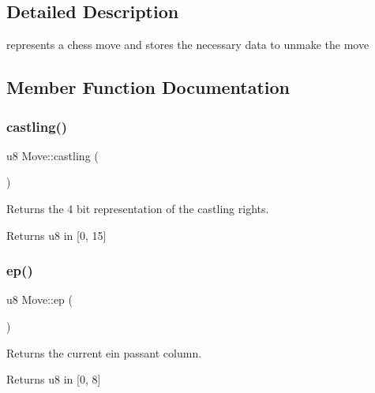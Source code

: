 \subsection{Detailed Description}
represents a chess move and stores the necessary data to unmake the move 

\subsection{Member Function Documentation}
\mbox{\label{structMove_a63e8e915392c159e8e2260f66ee476ef}} 
\subsubsection{\texorpdfstring{castling()}{castling()}}
{\footnotesize\ttfamily u8 Move\+::castling (\begin{DoxyParamCaption}{ }\end{DoxyParamCaption})\hspace{0.3cm}{\ttfamily [inline]}}



Returns the 4 bit representation of the castling rights. 

\begin{DoxyReturn}{Returns}
u8 in \mbox{[}0, 15\mbox{]} 
\end{DoxyReturn}
\mbox{\label{structMove_a70b0d186b359e6f3ef21a33e717ae0fa}} 
\subsubsection{\texorpdfstring{ep()}{ep()}}
{\footnotesize\ttfamily u8 Move\+::ep (\begin{DoxyParamCaption}{ }\end{DoxyParamCaption})\hspace{0.3cm}{\ttfamily [inline]}}



Returns the current ein passant column. 

\begin{DoxyReturn}{Returns}
u8 in \mbox{[}0, 8\mbox{]} 
\end{DoxyReturn}
\mbox{\label{structMove_a3e6186e7f7e7ce520545c43f9f00679e}} 
